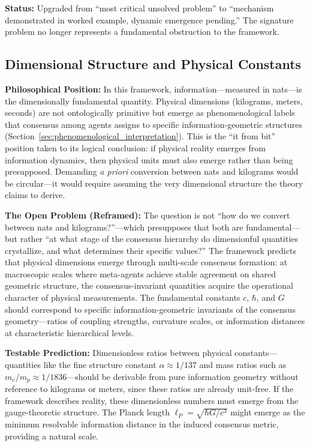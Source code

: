 \documentclass[11pt]{article}
\begin{document}
\textbf{Status:} Upgraded from ``most critical unsolved problem'' to ``mechanism demonstrated in worked example, dynamic emergence pending.'' The signature problem no longer represents a fundamental obstruction to the framework.

\subsection{Dimensional Structure and Physical Constants}
\label{sec:dimensional_structure}

\textbf{Philosophical Position:} In this framework, information---measured in nats---is the dimensionally fundamental quantity. Physical dimensions (kilograms, meters, seconds) are not ontologically primitive but emerge as phenomenological labels that consensus among agents assigns to specific information-geometric structures (Section~\ref{sec:phenomenological_interpretation}). This is the ``it from bit'' position taken to its logical conclusion: if physical reality emerges from information dynamics, then physical units must also emerge rather than being presupposed. Demanding \emph{a priori} conversion between nats and kilograms would be circular---it would require assuming the very dimensional structure the theory claims to derive.

\textbf{The Open Problem (Reframed):} The question is not ``how do we convert between nats and kilograms?''---which presupposes that both are fundamental---but rather ``at what stage of the consensus hierarchy do dimensionful quantities crystallize, and what determines their specific values?'' The framework predicts that physical dimensions emerge through multi-scale consensus formation: at macroscopic scales where meta-agents achieve stable agreement on shared geometric structure, the consensus-invariant quantities acquire the operational character of physical measurements. The fundamental constants $c$, $\hbar$, and $G$ should correspond to specific information-geometric invariants of the consensus geometry---ratios of coupling strengths, curvature scales, or information distances at characteristic hierarchical levels.

\textbf{Testable Prediction:} Dimensionless ratios between physical constants---quantities like the fine structure constant $\alpha \approx 1/137$ and mass ratios such as $m_e/m_p \approx 1/1836$---should be derivable from pure information geometry without reference to kilograms or meters, since these ratios are already unit-free. If the framework describes reality, these dimensionless numbers must emerge from the gauge-theoretic structure. The Planck length $\ell_P = \sqrt{\hbar G/c^3}$ might emerge as the minimum resolvable information distance in the induced consensus metric, providing a natural scale.
\end{document}

